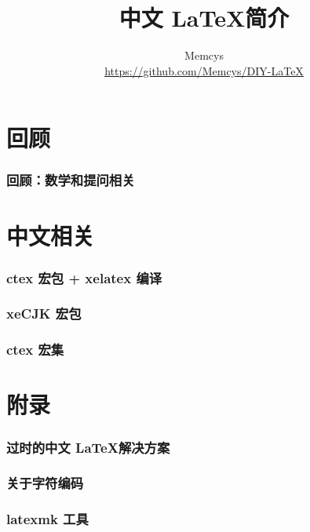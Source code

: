\documentclass{ctexart}
\title{中文 \LaTeX 简介}
\author{Memcys \\ \url{https://github.com/Memcys/DIY-LaTeX}}
\date{\zhdate{2019/10/27}}
\begin{document}
\maketitle

\part{回顾}

\setcounter{section}{-1}
\section{回顾：数学和提问相关}


\tableofcontents

\part{中文相关}

\section{ctex 宏包 + xelatex 编译}


\section{xeCJK 宏包}


\section{ctex 宏集}


\part{附录}
\appendix
\section[过时的中文方案]{过时的中文 \LaTeX 解决方案}


\section{关于字符编码}


\section{latexmk 工具}\label{ap:latexmk}

\end{document}
